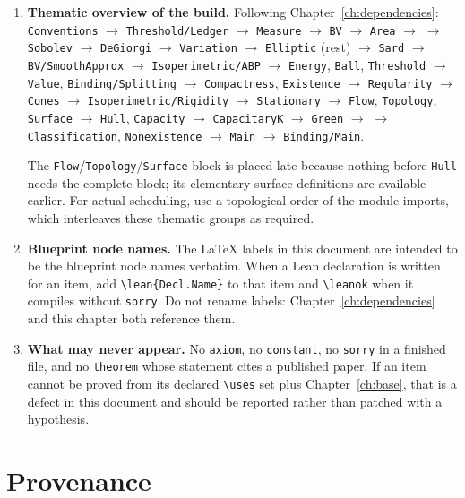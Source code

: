 \begin{enumerate}[leftmargin=*]
\item \textbf{Thematic overview of the build.}  Following
  Chapter~\ref{ch:dependencies}:
  \texttt{Conventions} $\to$ \texttt{Threshold/Ledger} $\to$
  \texttt{Measure} $\to$ \texttt{BV} $\to$ \texttt{Area} $\to$
   $\to$ \texttt{Sobolev} $\to$
  \texttt{DeGiorgi} $\to$ \texttt{Variation} $\to$ \texttt{Elliptic} (rest)
  $\to$ \texttt{Sard} $\to$ \texttt{BV/SmoothApprox} $\to$
  \texttt{Isoperimetric/ABP} $\to$ \texttt{Energy}, \texttt{Ball},
  \texttt{Threshold} $\to$ \texttt{Value}, \texttt{Binding/Splitting} $\to$
  \texttt{Compactness}, \texttt{Existence} $\to$ \texttt{Regularity} $\to$
  \texttt{Cones} $\to$ \texttt{Isoperimetric/Rigidity} $\to$
  \texttt{Stationary} $\to$ \texttt{Flow}, \texttt{Topology},
  \texttt{Surface} $\to$ \texttt{Hull}, \texttt{Capacity} $\to$
  \texttt{CapacitaryK} $\to$ \texttt{Green} $\to$
   $\to$ \texttt{Classification},
  \texttt{Nonexistence} $\to$ \texttt{Main} $\to$ \texttt{Binding/Main}.

  The \texttt{Flow}/\texttt{Topology}/\texttt{Surface} block is placed late
  because nothing before \texttt{Hull} needs the complete block; its
  elementary surface definitions are available earlier.  For actual
  scheduling, use a topological order of the module imports, which
  interleaves these thematic groups as required.

\item \textbf{Blueprint node names.}  The \LaTeX{} labels in this document are
  intended to be the blueprint node names verbatim.  When a Lean declaration
  is written for an item, add \verb|\lean{Decl.Name}| to that item and
  \verb|\leanok| when it compiles without \texttt{sorry}.  Do not rename
  labels: Chapter~\ref{ch:dependencies} and this chapter both reference them.

\item \textbf{What may never appear.}  No \texttt{axiom}, no
  \texttt{constant}, no \texttt{sorry} in a finished file, and no
  \texttt{theorem} whose statement cites a published paper.  If an item cannot
  be proved from its declared \verb|\uses| set plus
  Chapter~\ref{ch:base}, that is a defect in this document and should be
  reported rather than patched with a hypothesis.
\end{enumerate}

\section{Provenance}

